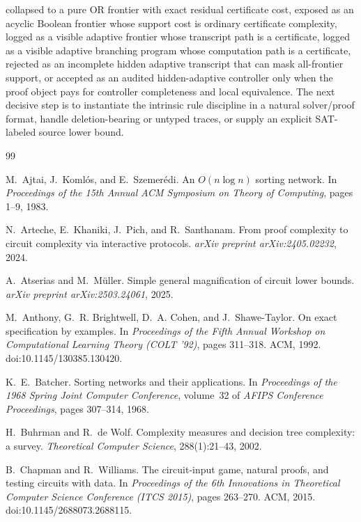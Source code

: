 \documentclass[11pt]{article}
\theoremstyle{definition}
\begin{document}
collapsed to a pure OR frontier with exact residual certificate cost, exposed as an acyclic Boolean frontier whose support cost is ordinary certificate complexity, logged as a visible adaptive frontier whose transcript path is a certificate, logged as a visible adaptive branching program whose computation path is a certificate, rejected as an incomplete hidden adaptive transcript that can mask all-frontier support, or accepted as an audited hidden-adaptive controller only when the proof object pays for controller completeness and local equivalence.  The next decisive step is to instantiate the intrinsic rule discipline in a natural solver/proof format, handle deletion-bearing or untyped traces, or supply an explicit SAT-labeled source lower bound.

\begin{thebibliography}{99}

M.~Ajtai, J.~Koml\'os, and E.~Szemer\'edi.
\newblock An $O(n\log n)$ sorting network.
\newblock In \emph{Proceedings of the 15th Annual ACM Symposium on Theory of Computing}, pages 1--9, 1983.

N.~Arteche, E.~Khaniki, J.~Pich, and R.~Santhanam.
\newblock From proof complexity to circuit complexity via interactive protocols.
\newblock \emph{arXiv preprint arXiv:2405.02232}, 2024.

A.~Atserias and M.~M\"uller.
\newblock Simple general magnification of circuit lower bounds.
\newblock \emph{arXiv preprint arXiv:2503.24061}, 2025.

M.~Anthony, G.~R. Brightwell, D.~A. Cohen, and J.~Shawe-Taylor.
\newblock On exact specification by examples.
\newblock In \emph{Proceedings of the Fifth Annual Workshop on Computational Learning Theory (COLT '92)}, pages 311--318. ACM, 1992.
\newblock doi:10.1145/130385.130420.

K.~E.~Batcher.
\newblock Sorting networks and their applications.
\newblock In \emph{Proceedings of the 1968 Spring Joint Computer Conference}, volume~32 of \emph{AFIPS Conference Proceedings}, pages 307--314, 1968.

H.~Buhrman and R.~de Wolf.
\newblock Complexity measures and decision tree complexity: a survey.
\newblock \emph{Theoretical Computer Science}, 288(1):21--43, 2002.

B.~Chapman and R.~Williams.
\newblock The circuit-input game, natural proofs, and testing circuits with data.
\newblock In \emph{Proceedings of the 6th Innovations in Theoretical Computer Science Conference (ITCS 2015)}, pages 263--270. ACM, 2015.
\newblock doi:10.1145/2688073.2688115.


\end{thebibliography}
\end{document}

